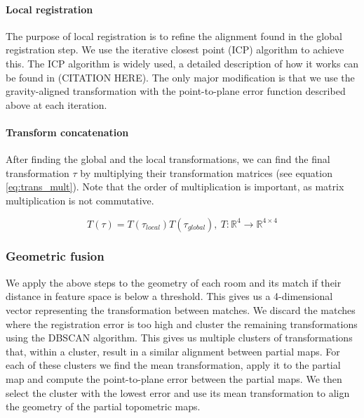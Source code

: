 \paragraph{Local registration}
The purpose of local registration is to refine the alignment found in the global registration step. We use the iterative closest point (ICP) algorithm to achieve this. The ICP algorithm is widely used, a detailed description of how it works can be found in (CITATION HERE). The only major modification is that we use the gravity-aligned transformation with the point-to-plane error function described above at each iteration.


\paragraph{Transform concatenation}
After finding the global and the local transformations, we can find the final transformation \(\tau\) by multiplying their transformation matrices (see equation \ref{eq:trans_mult}). Note that the order of multiplication is important, as matrix multiplication is not commutative.

\begin{equation}
    \label{eq:trans_mult}
    T(\tau) = T(\tau_{local})T(\tau_{global}),\ T: \mathbb{R}^4 \rightarrow \mathbb{R}^{4 \times 4}
\end{equation}

\subsubsection{Geometric fusion}
We apply the above steps to the geometry of each room and its match if their distance in feature space is below a threshold. This gives us a 4-dimensional vector representing the transformation between matches. We discard the matches where the registration error is too high and cluster the remaining transformations using the DBSCAN algorithm. This gives us multiple clusters of transformations that, within a cluster, result in a similar alignment between partial maps. For each of these clusters we find the mean transformation, apply it to the partial map and compute the point-to-plane error between the partial maps. We then select the cluster with the lowest error and use its mean transformation to align the geometry of the partial topometric maps. 


